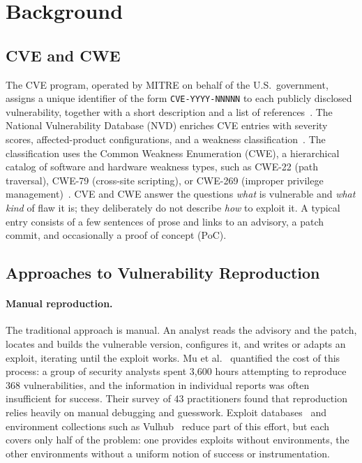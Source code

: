 \section{Background}
\label{sec:background}

\subsection{CVE and CWE}

The CVE program, operated by MITRE on behalf of the U.S.\ government, assigns
a unique identifier of the form \texttt{CVE-YYYY-NNNNN} to each publicly
disclosed vulnerability, together with a short description and a list of
references~\cite{cve}. The National Vulnerability Database (NVD) enriches CVE
entries with severity scores, affected-product configurations, and a weakness
classification~\cite{nvd}. The classification uses the Common Weakness
Enumeration (CWE), a hierarchical catalog of software and hardware weakness
types, such as CWE-22 (path traversal), CWE-79 (cross-site scripting), or
CWE-269 (improper privilege management)~\cite{cwe}. CVE and CWE answer the
questions \emph{what} is vulnerable and \emph{what kind} of flaw it is; they
deliberately do not describe \emph{how} to exploit it. A typical entry
consists of a few sentences of prose and links to an advisory, a patch
commit, and occasionally a proof of concept (PoC).

\subsection{Approaches to Vulnerability Reproduction}

\paragraph{Manual reproduction.}
The traditional approach is manual. An analyst reads the advisory and the
patch, locates and builds the vulnerable version, configures it, and writes
or adapts an exploit, iterating until the exploit works. Mu et
al.~\cite{mu2018reproducibility} quantified the cost of this process: a group
of security analysts spent 3,600 hours attempting to reproduce 368
vulnerabilities, and the information in individual reports was often
insufficient for success. Their survey of 43 practitioners found that
reproduction relies heavily on manual debugging and guesswork. Exploit
databases~\cite{exploitdb} and environment collections such as
Vulhub~\cite{vulhub} reduce part of this effort, but each covers only half of
the problem: one provides exploits without environments, the other
environments without a uniform notion of success or instrumentation.

